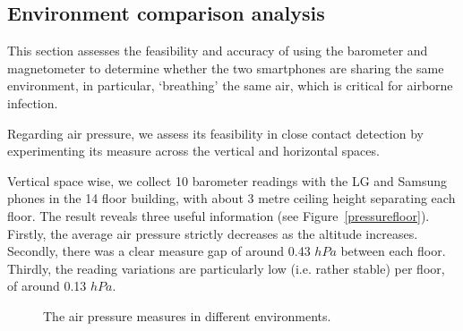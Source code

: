\documentclass[graybox]{svmult}
\begin{document}
\subsection{Environment comparison analysis}
\label{sec:environment}
This section assesses the feasibility and accuracy of using the barometer and magnetometer to determine whether the two smartphones are sharing the same environment, in particular, `breathing' the same air, which is critical for airborne infection.

Regarding air pressure, we assess its feasibility in close contact detection by experimenting its measure across the vertical and horizontal spaces.

Vertical space wise, we collect 10 barometer readings with the LG and Samsung phones in the 14 floor building, with about 3 metre ceiling height separating each floor. The result reveals three useful information (see Figure~\ref{pressurefloor}). Firstly, the average air pressure strictly decreases as the altitude increases. Secondly, there was a clear measure gap of around 0.43 $hPa$ between each floor. Thirdly, the reading variations are particularly low (i.e. rather stable) per floor, of around 0.13 $hPa$. 

\begin{figure}[h]
	\centering
	
	\hspace{0.5pt}
	
	\caption{The air pressure measures in different environments.}
	\label{airpressure}
\end{figure}
\end{document}
